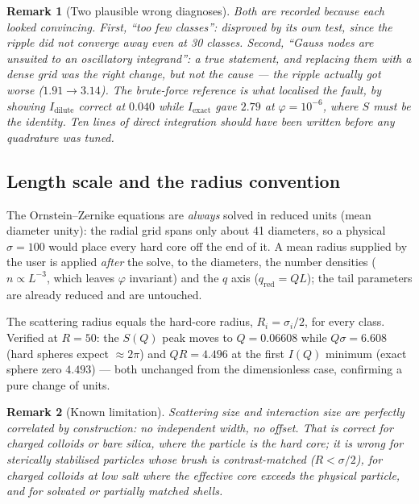 \documentclass[11pt,a4paper]{article}
\newtheorem{remark}{Remark}
\begin{document}
\begin{remark}[Two plausible wrong diagnoses]
Both are recorded because each looked convincing. First, ``too few classes'':
disproved by its own test, since the ripple did not converge away even at 30
classes. Second, ``Gauss nodes are unsuited to an oscillatory integrand'': a
true statement, and replacing them with a dense grid was the right change, but
not the cause --- the ripple actually got \emph{worse} ($1.91\rightarrow3.14$).
The brute-force reference is what localised the fault, by showing
$I_{\text{dilute}}$ correct at $0.040$ while $I_{\text{exact}}$ gave $2.79$ at
$\varphi=10^{-6}$, where $S$ must be the identity. Ten lines of direct
integration should have been written before any quadrature was tuned.
\end{remark}

\subsection{Length scale and the radius convention}

The Ornstein--Zernike equations are \emph{always} solved in reduced units
(mean diameter unity): the radial grid spans only about 41 diameters, so a
physical $\sigma=100$ would place every hard core off the end of it. A mean
radius supplied by the user is applied \emph{after} the solve, to the
diameters, the number densities ($n\propto L^{-3}$, which leaves $\varphi$
invariant) and the $q$ axis ($q_{\text{red}}=QL$); the tail parameters are
already reduced and are untouched.

The scattering radius equals the hard-core radius, $R_i=\sigma_i/2$, for every
class. Verified at $R=50$: the $S(Q)$ peak moves to $Q=0.06608$ while
$Q\sigma=6.608$ (hard spheres expect $\approx2\pi$) and $QR=4.496$ at the
first $I(Q)$ minimum (exact sphere zero $4.493$) --- both unchanged from the
dimensionless case, confirming a pure change of units.

\begin{remark}[Known limitation]
Scattering size and interaction size are perfectly correlated by construction:
no independent width, no offset. That is correct for charged colloids or bare
silica, where the particle \emph{is} the hard core; it is wrong for sterically
stabilised particles whose brush is contrast-matched ($R<\sigma/2$), for
charged colloids at low salt where the effective core exceeds the physical
particle, and for solvated or partially matched shells.
\end{remark}
\end{document}
